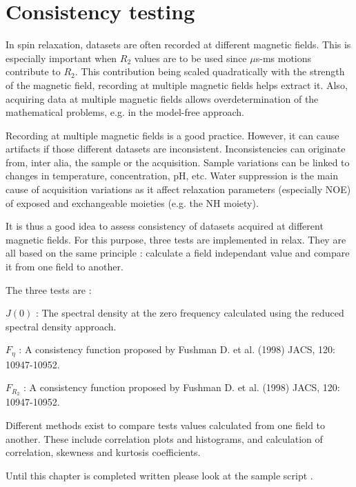 
\chapter{Consistency testing}


In spin relaxation, datasets are often recorded at different magnetic fields. This is especially important when $R_2$ values are to be used since $\mu$s-ms motions contribute to $R_2$. This contribution being scaled quadratically with the strength of the magnetic field, recording at multiple magnetic fields helps extract it. Also, acquiring data at multiple magnetic fields allows overdetermination of the mathematical problems, e.g. in the model-free approach.

Recording at multiple magnetic fields is a good practice. However, it can cause artifacts if those different datasets are inconsistent. Inconsistencies can originate from, inter alia, the sample or the acquisition. Sample variations can be linked to changes in temperature, concentration, pH, etc. Water suppression is the main cause of acquisition variations as it affect relaxation parameters (especially NOE) of exposed and exchangeable moieties (e.g. the NH moiety).

It is thus a good idea to assess consistency of datasets acquired at different magnetic fields. For this purpose, three tests are implemented in relax. They are all based on the same principle : calculate a field independant value and compare it from one field to another.

The three tests are :

$J(0)$ : The spectral density at the zero frequency calculated using the reduced spectral density approach.

$F_\eta$ : A consistency function proposed by Fushman D. et al. (1998) JACS, 120: 10947-10952.

$F_{R_2}$ : A consistency function proposed by Fushman D. et al. (1998) JACS, 120: 10947-10952.

Different methods exist to compare tests values calculated from one field to another. These include correlation plots and histograms, and calculation of correlation, skewness and kurtosis coefficients.



Until this chapter is completed written please look at the sample script .
